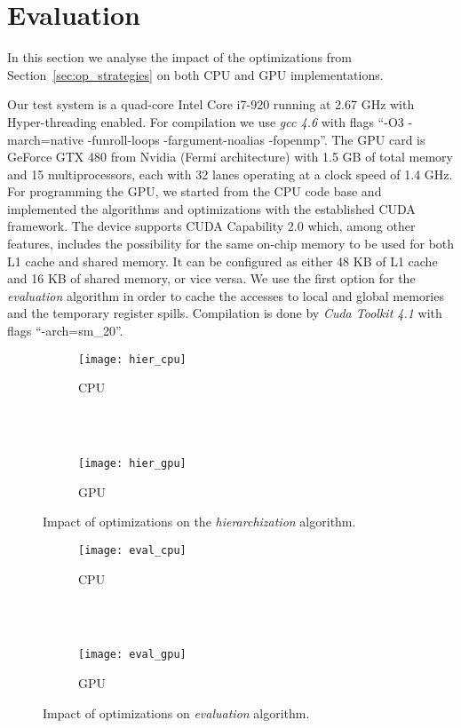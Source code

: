 \section{Evaluation}
\label{sec:evaluation}

In this section we analyse the impact of the optimizations from
Section~\ref{sec:op_strategies} on both CPU and GPU implementations.

Our test system is a quad-core Intel Core i7-920 running at 2.67 GHz with
Hyper-threading enabled. For compilation we use \textit{gcc 4.6} with flags
``-O3 -march=native -funroll-loops -fargument-noalias -fopenmp''. The GPU card
is GeForce GTX 480 from Nvidia (Fermi architecture) with 1.5 GB of total memory
and 15 multiprocessors, each with 32 lanes operating at a clock speed of 1.4
GHz. For programming the GPU, we started from the CPU code base and implemented
the algorithms and optimizations with the established CUDA framework. The
device supports CUDA Capability 2.0 which, among other features, includes the
possibility for the same on-chip memory to be used for both L1 cache and shared
memory. It can be configured as either 48 KB of L1 cache and 16 KB of shared
memory, or vice versa. We use the first option for the \textit{evaluation}
algorithm in order to cache the accesses to local and global memories and
the temporary register spills. Compilation is done by \textit{Cuda Toolkit 4.1}
with flags ``-arch=sm\_20''.

\begin{figure}[t]
  \begin{subfigure}[t]{1\linewidth}
    \centering
    \texttt{[image: hier\_cpu]} \\
    \caption{CPU}
  \end{subfigure}
  \\ \\
  \begin{subfigure}[t]{1\linewidth}
    \centering
    \texttt{[image: hier\_gpu]}
    \caption{GPU}
  \end{subfigure}
  \caption{Impact of optimizations on the \textit{hierarchization} algorithm.}
  \label{fig:hier_results}
\end{figure}

\begin{figure}[t]
  \begin{subfigure}[t]{1\linewidth}
    \centering
    \texttt{[image: eval\_cpu]} \\
    \caption{CPU}
  \end{subfigure}
  \\ \\
  \begin{subfigure}[t]{1\linewidth}
    \centering
    \texttt{[image: eval\_gpu]}
    \caption{GPU}
  \end{subfigure}
  \caption{Impact of optimizations on \textit{evaluation} algorithm.}
  \label{fig:eval_results}
\end{figure}

